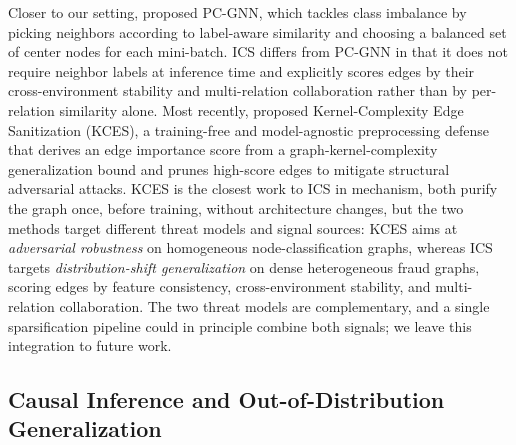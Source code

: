 \documentclass[11pt]{article}
\begin{document}
Closer to our setting, \cite{liu2021pcgnn} proposed PC-GNN, which tackles class imbalance by picking neighbors according to label-aware similarity and choosing a balanced set of center nodes for each mini-batch. ICS differs from PC-GNN in that it does not require neighbor labels at inference time and explicitly scores edges by their cross-environment stability and multi-relation collaboration rather than by per-relation similarity alone. Most recently, \cite{jia2026kces} proposed Kernel-Complexity Edge Sanitization (KCES), a training-free and model-agnostic preprocessing defense that derives an edge importance score from a graph-kernel-complexity generalization bound and prunes high-score edges to mitigate structural adversarial attacks. KCES is the closest work to ICS in mechanism, both purify the graph once, before training, without architecture changes, but the two methods target different threat models and signal sources: KCES aims at \emph{adversarial robustness} on homogeneous node-classification graphs, whereas ICS targets \emph{distribution-shift generalization} on dense heterogeneous fraud graphs, scoring edges by feature consistency, cross-environment stability, and multi-relation collaboration. The two threat models are complementary, and a single sparsification pipeline could in principle combine both signals; we leave this integration to future work.

\subsection{Causal Inference and Out-of-Distribution Generalization}
\end{document}
